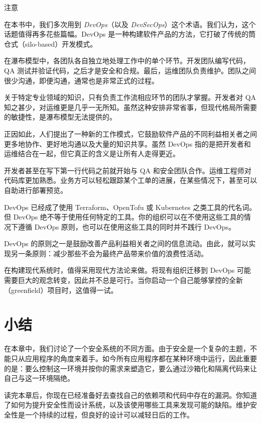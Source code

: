 \begin{myNotic}{注意}

\label{idx:1155}
在本书中，我们多次用到 \emph{DevOps}（以及 \emph{DevSecOps}）这个术语。我们认为，这个话题值得再多花些篇幅。DevOps 是一种构建软件产品的方法，它打破了传统的筒仓式（silo-based）开发模式。

在瀑布模型中，各团队各自独立地处理工作中的单个环节。开发团队编写代码，QA 测试并验证代码，之后才是安全和合规。最后，运维团队负责维护。团队之间很少沟通，即便沟通，通常也是非常正式的过程。

关于特定专业领域的知识，只有负责工作流相应环节的团队才掌握。开发者对 QA 知之甚少，对运维更是几乎一无所知。虽然这种安排非常省事，但现代格局所需要的敏捷性，是瀑布模型无法提供的。

正因如此，人们提出了一种新的工作模式，它鼓励软件产品的不同利益相关者之间更多地协作、更好地沟通以及大量的知识共享。虽然 DevOps 指的是把开发者和运维结合在一起，但它真正的含义是让所有人走得更近。

\label{idx:1156}
开发者甚至在写下第一行代码之前就开始与 QA 和安全团队合作。运维工程师对代码库更加熟悉。业务方可以轻松跟踪某个工单的进展，在某些情况下，甚至可以自助进行部署预览。

DevOps 已经成了使用 Terraform、OpenTofu 或 Kubernetes 之类工具的代名词。但 DevOps 绝不等于使用任何特定的工具。你的组织可以在不使用这些工具的情况下遵循 DevOps 原则，也可以在使用这些工具的同时并不践行 DevOps。

\label{idx:1157}
DevOps 的原则之一是鼓励改善产品利益相关者之间的信息流动。由此，就可以实现另一条原则：减少那些不会为最终产品带来价值的浪费性活动。

在构建现代系统时，值得采用现代方法论来做。将现有组织迁移到 DevOps 可能需要巨大的观念转变，因此并不总是可行。当你启动一个自己能够掌控的全新（greenfield）项目时，这值得一试。
\end{myNotic}

\section{小结}

在本章中，我们讨论了一个安全系统的不同方面。由于安全是一个复杂的主题，不能只从应用程序的角度来着手。如今所有应用程序都在某种环境中运行，因此重要的是：要么控制这一环境并按你的需求来塑造它，要么通过沙箱化和隔离代码来让自己与这一环境隔绝。

读完本章后，你现在已经准备好去查找自己的依赖项和代码中存在的漏洞。你知道了如何为提升安全性而设计系统，以及该使用哪些工具来发现可能的缺陷。维护安全性是一个持续的过程，但良好的设计可以减轻日后的工作。

